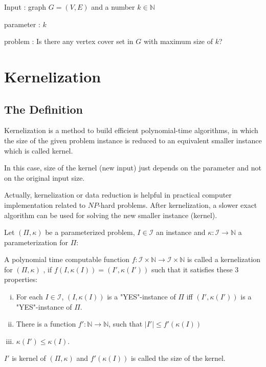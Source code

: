 \documentclass{beamer}
\begin{document}
{\begin{defi}
\begin{exam}
Input : graph $G = (V, E)$ and a number $k \in \mathbb{N}$

parameter : $k$

problem : Is there any vertex cover set in $G$ with maximum size of $k$?
\end{exam}



\newpage

\section{Kernelization}
\subsection{The Definition}
Kernelization is a method to build efficient polynomial-time algorithms, 
in which the size of the given problem instance is reduced to an equivalent smaller instance which is called kernel. 

In this case, size of the kernel (new input) just depends on the parameter and not on the original input size. 

Actually, kernelization or data reduction is helpful in practical computer implementation related to $NP$-hard problems. After kernelization, a slower exact algorithm can be used for solving the new smaller instance (kernel).

\begin{defi}
Let $(\Pi, \kappa)$ be a parameterized problem, $I\in\mathcal{I}$ an instance and $\kappa: \mathcal{I} \to \mathbb{N}$ a parameterization for $\Pi$:

A polynomial time computable function $f : \mathcal{I} \times \mathbb{N} \to \mathcal{I} \times \mathbb{N}$ is called a
kernelization for $(\Pi, \kappa)$ , if $f(I, \kappa(I)) = (I', \kappa(I'))$ such that it satisfies these 3 properties:

\begin{enumerate}[(i)]
\item For each $I \in \mathcal{I}$, $(I, \kappa(I))$ is a "YES"-instance of $\Pi$ iff $(I', \kappa(I'))$ is a "YES"-instance of $\Pi$.

\item There is a function $f': \mathbb{N} \to \mathbb{N}$, such that $|I'| \leq f'(\kappa(I))$

\item $\kappa(I')\leq \kappa(I)$.
\end{enumerate}

$I'$ is kernel of $(\Pi, \kappa)$ and $f'(\kappa(I))$ is called the size of the kernel.


\end{defi}
\end{defi}}
\end{document}
